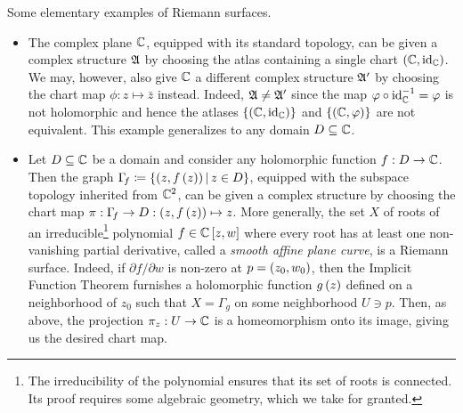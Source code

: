 \documentclass[../Moduli_Spaces_of_Riemann_Surfaces.tex]{subfiles}
\begin{document}
    \begin{example}
        Some elementary examples of Riemann surfaces.
        \begin{itemize}
            \item The complex plane $\mathbb{C}$, equipped with its standard topology, can be given a complex structure $\mathfrak{A}$ by choosing the atlas containing a single chart $\left(\mathbb{C},\operatorname{id}_{\mathbb{C}}\right)$. We may, however, also give $\mathbb{C}$ a different complex structure $\mathfrak{A}'$ by choosing the chart map $\phi:z\mapsto\bar{z}$ instead. Indeed, $\mathfrak{A}\neq\mathfrak{A}'$ since the map $\varphi\circ\operatorname{id}_{\mathbb{C}}^{-1}=\varphi$ is not holomorphic and hence the atlases $\left\{\left(\mathbb{C},\operatorname{id}_{\mathbb{C}}\right)\right\}$ and $\left\{\left(\mathbb{C},\varphi\right)\right\}$ are not equivalent. This example generalizes to any domain $D\subseteq\mathbb{C}$.
            \item Let $D\subseteq\mathbb{C}$ be a domain and consider any holomorphic function $f:D\to\mathbb{C}$. Then the graph $\Gamma\!_f\coloneqq\left\{\left(z,f\left(z\right)\right)\,\middle\vert\, z\in D\right\}$, equipped with the subspace topology inherited from $\mathbb{C}^2$, can be given a complex structure by choosing the chart map $\pi:\Gamma\!_f\to D:\left(z,f\left(z\right)\right)\mapsto z$. More generally, the set $X$ of roots of an irreducible\footnote{The irreducibility of the polynomial ensures that its set of roots is connected. Its proof requires some algebraic geometry, which we take for granted.} polynomial $f\in\mathbb{C}\left[z,w\right]$ where every root has at least one non-vanishing partial derivative, called a \textit{smooth affine plane curve}, is a Riemann surface. Indeed, if $\partial f/\partial w$ is non-zero at $p=\left(z_0,w_0\right)$, then the Implicit Function Theorem furnishes a holomorphic function $g\left(z\right)$ defined on a neighborhood of $z_0$ such that $X=\Gamma_{\!g}$ on some neighborhood $U\ni p$. Then, as above, the projection $\pi_z:U\to\mathbb{C}$ is a homeomorphism onto its image, giving us the desired chart map.\exqed
        \end{itemize}
    \end{example}
\end{document}
